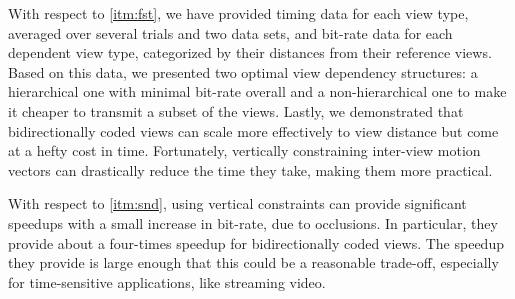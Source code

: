 \documentclass{sig-alternate-05-2015}
\begin{document}
With respect to \ref{itm:fst}, we have provided timing data for each view type,
averaged over several trials and two data sets, and bit-rate data for each
dependent view type, categorized by their distances from their reference views.
Based on this data, we presented two optimal view dependency structures: a
hierarchical one with minimal bit-rate overall and a non-hierarchical one to
make it cheaper to transmit a subset of the views. Lastly, we demonstrated that
bidirectionally coded views can scale more effectively to view distance but
come at a hefty cost in time. Fortunately, vertically constraining inter-view
motion vectors can drastically reduce the time they take, making them more
practical.

With respect to \ref{itm:snd}, using vertical constraints can provide
significant speedups with a small increase in bit-rate, due to occlusions. 
In particular, they provide about a four-times speedup for bidirectionally
coded views. The speedup they provide is large enough that this could be a
reasonable trade-off, especially for time-sensitive applications, like streaming
video.



\end{document}
